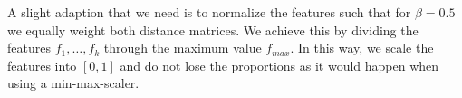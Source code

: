 A slight adaption that we need is to normalize the features such that for $\beta = 0.5$ we equally weight both distance matrices. We achieve this by dividing the features $f_1, \dots, f_k$ through the maximum value $f_{max}$. In this way, we scale the features into $[0,1]$ and do not lose the proportions as it would happen when using a min-max-scaler.